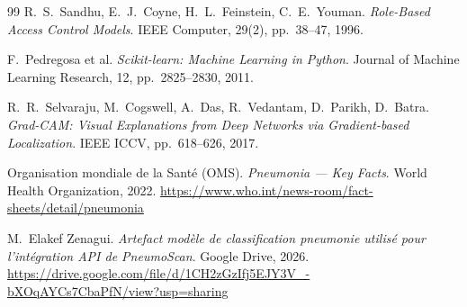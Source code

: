 \documentclass[12pt, a4paper]{report}
\newif\ifquickbuild
\begin{document}
\begin{thebibliography}{99}
R.~S.~Sandhu, E.~J.~Coyne, H.~L.~Feinstein, C.~E.~Youman.
\textit{Role-Based Access Control Models}.
IEEE Computer, 29(2), pp.~38--47, 1996.

F.~Pedregosa et al.
\textit{Scikit-learn: Machine Learning in Python}.
Journal of Machine Learning Research, 12, pp.~2825--2830, 2011.

R.~R.~Selvaraju, M.~Cogswell, A.~Das, R.~Vedantam, D.~Parikh, D.~Batra.
\textit{Grad-CAM: Visual Explanations from Deep Networks
via Gradient-based Localization}.
IEEE ICCV, pp.~618--626, 2017.

Organisation mondiale de la Santé (OMS).
\textit{Pneumonia --- Key Facts}.
World Health Organization, 2022.
\url{https://www.who.int/news-room/fact-sheets/detail/pneumonia}

M.~Elakef Zenagui.
\textit{Artefact modèle de classification pneumonie utilisé pour l'intégration API de PneumoScan}.
Google Drive, 2026.
\url{https://drive.google.com/file/d/1CH2zGzIfj5EJY3V_-bXOqAYCs7CbaPfN/view?usp=sharing}

\end{thebibliography}

\printglossaries
\ifquickbuild\else
\printglossaries
\fi
\end{document}
